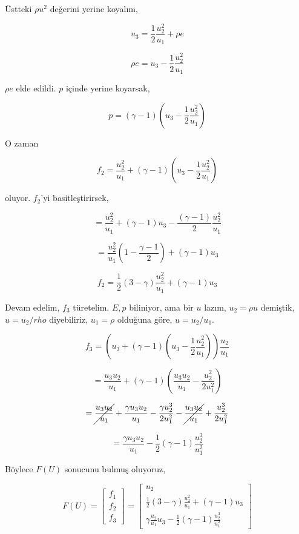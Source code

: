\documentclass[12pt,fleqn]{article}\usepackage{../../common}
\begin{document}
Üstteki $\rho u^2$ değerini yerine koyalım,

$$
u_3 = \frac{1}{2} \frac{u_2^2}{u_1} + \rho e
$$

$$
\rho e = u_3 - \frac{1}{2} \frac{u_2^2}{u_1} 
$$

$\rho e$ elde edildi. $p$ içinde yerine koyarsak,

$$
p = (\gamma - 1) \left(  u_3 - \frac{1}{2} \frac{u_2^2}{u_1}   \right)
$$

O zaman

$$
f_2 = \frac{u_2^2}{u_1} +  (\gamma - 1) \left(  u_3 - \frac{1}{2} \frac{u_2^2}{u_1}   \right)
$$

oluyor. $f_2$'yi basitleştirirsek,

$$
= \frac{u_2^2}{u_1} + (\gamma - 1)u_3 - \frac{(\gamma-1)}{2} \frac{u_2^2}{u_1}
$$

$$
= \frac{u_2^2}{u_1} \left( 1 - \frac{\gamma-1}{2}  \right) + (\gamma - 1)u_3
$$

$$
f_2 = \frac{1}{2} (3-\gamma) \frac{u_2^2}{u_1} + (\gamma - 1)u_3
$$

Devam edelim, $f_3$ türetelim. $E,p$ biliniyor, ama bir $u$ lazım,
$u_2 = \rho u$ demiştik, $u = u_2 / rho$ diyebiliriz, $u_1 = \rho$
olduğuna göre, $u = u_2 / u_1$.

$$
f_3 =  \left(
  u_3 + (\gamma - 1) ( u_3 - \frac{1}{2} \frac{u_2^2}{u_1})
\right) \frac{u_2}{u_1}
$$

$$
= \frac{u_3 u_2}{u_1} + (\gamma - 1) \left(
  \frac{u_3 u_2}{u_1} - \frac{u_2^2}{2u_1^2}
\right)
$$

$$
=
\cancel{\frac{u_3 u_2}{u_1}} +
\frac{\gamma u_3 u_2}{u_1} -
\frac{\gamma u_2^3}{2u_1^2} -
\cancel{\frac{u_3 u_2}{u_1}} +
\frac{u_2^3}{2 u_1^2}
$$

$$
= \frac{\gamma u_3 u_2}{u_1} - \frac{1}{2} (\gamma - 1) \frac{u_2^3}{u_1^2}
$$

Böylece $F(U)$ sonucunu bulmuş oluyoruz, 

$$
F(U) =
\left[\begin{array}{c}
f_1 \\ f_2  \\ f_3
\end{array}\right] =
\left[\begin{array}{c}
u_2 \\
\frac{1}{2} (3-\gamma) \frac{u_2^2}{u_1} + (\gamma - 1)u_3 \\
\gamma \frac{u_2}{u_1} u_3 - \frac{1}{2} (\gamma - 1)\frac{u_2^3}{u_1^2}
\end{array}\right] 
$$
\end{document}
